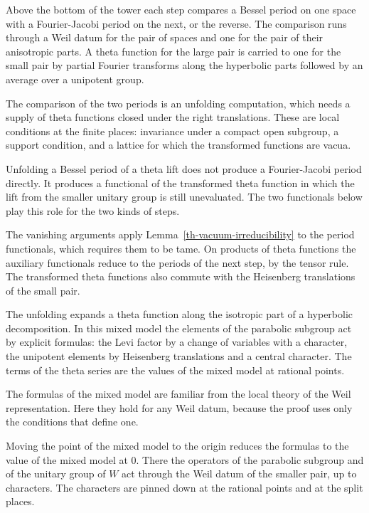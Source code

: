 Above the bottom of the tower each step compares a Bessel period on one space
with a Fourier-Jacobi period on the next, or the reverse. The comparison runs
through a Weil datum for the pair of spaces and one for the pair of their
anisotropic parts. A theta function for the large pair is carried to one for the
small pair by partial Fourier transforms along the hyperbolic parts followed by
an average over a unipotent group.

The comparison of the two periods is an unfolding computation, which needs a
supply of theta functions closed under the right translations. These are local
conditions at the finite places: invariance under a compact open subgroup, a
support condition, and a lattice for which the transformed functions are
vacua.

Unfolding a Bessel period of a theta lift does not produce a Fourier-Jacobi
period directly. It produces a functional of the transformed theta function in
which the lift from the smaller unitary group is still unevaluated. The two
functionals below play this role for the two kinds of steps.

The vanishing arguments apply Lemma~\ref{th-vacuum-irreducibility} to the
period functionals, which requires them to be tame. On products of theta
functions the auxiliary functionals reduce to the periods of the next step, by
the tensor rule. The transformed theta functions also commute with the
Heisenberg translations of the small pair.

The unfolding expands a theta function along the isotropic part of a
hyperbolic decomposition. In this mixed model the elements of the parabolic
subgroup act by explicit formulas: the Levi factor by a change of variables
with a character, the unipotent elements by Heisenberg translations and a
central character. The terms of the theta series are the values of the mixed
model at rational points.

The formulas of the mixed model are familiar from the local theory of the Weil
representation. Here they hold for any Weil datum, because the proof uses only
the conditions that define one.

Moving the point of the mixed model to the origin reduces the formulas to the
value of the mixed model at $0$. There the operators of the parabolic subgroup
and of the unitary group of $W$ act through the Weil datum of the smaller pair,
up to characters. The characters are pinned down at the rational points and at
the split places.

